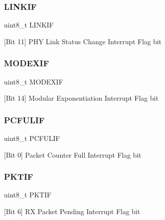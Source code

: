 \subsubsection{\texorpdfstring{LINKIF}{LINKIF}}
{\footnotesize\ttfamily uint8\+\_\+t L\+I\+N\+K\+IF}



\mbox{[}Bit 11\mbox{]} P\+HY Link Status Change Interrupt Flag bit 

\mbox{\label{structinterrupt_flags__t_ad01e267d93eace1bc14b2e98c7a6e23b}} 
\subsubsection{\texorpdfstring{MODEXIF}{MODEXIF}}
{\footnotesize\ttfamily uint8\+\_\+t M\+O\+D\+E\+X\+IF}



\mbox{[}Bit 14\mbox{]} Modular Exponentiation Interrupt Flag bit 

\mbox{\label{structinterrupt_flags__t_a54ca36edd15d3a43ea58c44c9b4632d1}} 
\subsubsection{\texorpdfstring{PCFULIF}{PCFULIF}}
{\footnotesize\ttfamily uint8\+\_\+t P\+C\+F\+U\+L\+IF}



\mbox{[}Bit 0\mbox{]} Packet Counter Full Interrupt Flag bit 

\mbox{\label{structinterrupt_flags__t_a4bfff8bb603cb3baf42fabe79d5e0a39}} 
\subsubsection{\texorpdfstring{PKTIF}{PKTIF}}
{\footnotesize\ttfamily uint8\+\_\+t P\+K\+T\+IF}



\mbox{[}Bit 6\mbox{]} RX Packet Pending Interrupt Flag bit 

